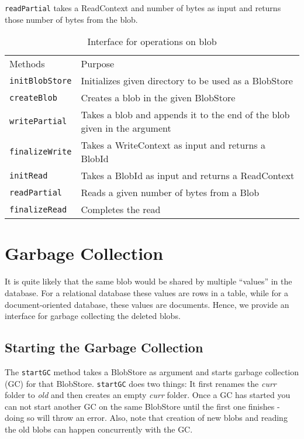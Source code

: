 \texttt{readPartial} takes a ReadContext and number of bytes as input and returns those number of bytes from the blob.

\begin{table}[hbt]
\caption{Interface for operations on blob}
\label{tab:interface-blob}
\begin{center}
  \begin{tabularx}{0.91\textwidth}{lX}
    \hline\noalign{\smallskip}
    Methods & Purpose \\
    \noalign{\smallskip}
    \hline
    \noalign{\smallskip}
    \texttt{initBlobStore} & Initializes given directory to be used as a BlobStore \\
    \texttt{createBlob} & Creates a blob in the given BlobStore\\
    \texttt{writePartial} & Takes a blob and appends it to the end of the blob given in the argument\\
    \texttt{finalizeWrite} & Takes a WriteContext as input and returns a BlobId \\
    \texttt{initRead} & Takes a BlobId as input and returns a ReadContext \\
    \texttt{readPartial} & Reads a given number of bytes from a Blob \\
    \texttt{finalizeRead} & Completes the read \\
    \hline
  \end{tabularx}
\end{center}
\end{table}

\section{Garbage Collection}
It is quite likely that the same blob would be shared by multiple ``values'' in the database. For a relational database these values are rows in a table, while for a document-oriented database, these values are documents.
Hence, we provide an interface for garbage collecting the deleted blobs.

\subsection{Starting the Garbage Collection}
The \texttt{startGC} method takes a BlobStore as argument and starts garbage collection (GC) for that BlobStore.
\texttt{startGC} does two things: It first renames the \textit{curr} folder to \textit{old} and then creates an empty \textit{curr} folder.
Once a GC has started you can not start another GC on the same BlobStore until the first one finishes - doing so will throw an error. Also, note that creation of new blobs and reading the old blobs can happen concurrently with the GC.

